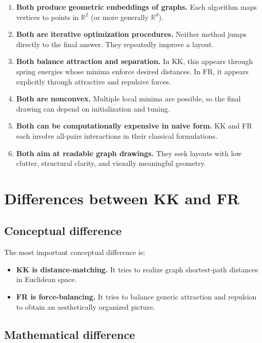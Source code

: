 \documentclass[11pt]{article}
\newcommand{\R}{\mathbb{R}}
\begin{document}
\begin{enumerate}[leftmargin=1.5em]
\item \textbf{Both produce geometric embeddings of graphs.} Each algorithm maps
vertices to points in $\R^2$ (or more generally $\R^d$).

\item \textbf{Both are iterative optimization procedures.} Neither method jumps
directly to the final answer. They repeatedly improve a layout.

\item \textbf{Both balance attraction and separation.} In KK, this appears
through spring energies whose minima enforce desired distances. In FR, it
appears explicitly through attractive and repulsive forces.

\item \textbf{Both are nonconvex.} Multiple local minima are possible, so the
final drawing can depend on initialization and tuning.

\item \textbf{Both can be computationally expensive in naive form.} KK and FR
each involve all-pairs interactions in their classical formulations.

\item \textbf{Both aim at readable graph drawings.} They seek layouts with low
clutter, structural clarity, and visually meaningful geometry.
\end{enumerate}

\section{Differences between KK and FR}

\subsection{Conceptual difference}

The most important conceptual difference is:
\begin{itemize}[leftmargin=1.5em]
\item \textbf{KK is distance-matching.} It tries to realize graph shortest-path
distances in Euclidean space.
\item \textbf{FR is force-balancing.} It tries to balance generic attraction and
repulsion to obtain an aesthetically organized picture.
\end{itemize}

\subsection{Mathematical difference}
\end{document}

